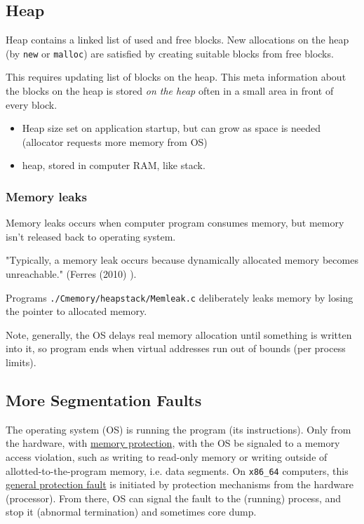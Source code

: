 \documentclass[10pt]{amsart}
\begin{document}
\begin{multicols*}{2}
\subsection{Heap}  

Heap contains a linked list of used and free blocks.  New allocations on the heap (by \verb|new| or \verb|malloc|) are satisfied by creating suitable blocks from free blocks.  

This requires updating list of blocks on the heap.  This meta information about the blocks on the heap is stored \emph{on the heap} often in a small area in front of every block.  

\begin{itemize}
	\item Heap size set on application startup, but can grow as space is needed (allocator requests more memory from OS)
	\item heap, stored in computer RAM, like stack.
\end{itemize}

\subsubsection{Memory leaks}  

Memory leaks occurs when computer program consumes memory, but memory isn't released back to operating system.  

"Typically, a memory leak occurs because dynamically allocated memory becomes unreachable."  (Ferres (2010) \cite{Ferr2010}).  

Programs \verb|./Cmemory/heapstack/Memleak.c| deliberately leaks memory by losing the pointer to allocated memory.  

Note, generally, the OS delays real memory allocation until something is written into it, so program ends when virtual addresses run out of bounds (per process limits).  

\subsection{More Segmentation Faults}  

The operating system (OS) is running the program (its instructions).  Only from the hardware, with \href{https://en.wikipedia.org/wiki/Memory_protection}{memory protection}, with the OS be signaled to a memory access violation, such as writing to read-only memory or writing outside of allotted-to-the-program memory, i.e. data segments.  On \verb|x86_64| computers, this \href{https://en.wikipedia.org/wiki/General_protection_fault}{general protection fault} is initiated by protection mechanisms from the hardware (processor).  From there, OS can signal the fault to the (running) process, and stop it (abnormal termination) and sometimes core dump. 


\end{multicols*}
\end{document}

